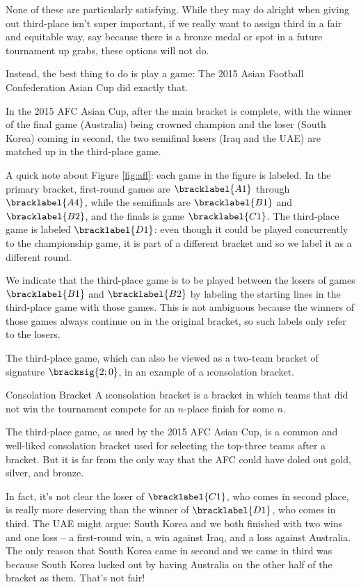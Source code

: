 {    None of these are particularly satisfying. While they may do alright when giving out third-place isn't super important, if we really want to assign third in a fair and equitable way, say because there is a bronze medal or spot in a future tournament up grabs, these options will not do.

    Instead, the best thing to do is play a game: The 2015 Asian Football Confederation Asian Cup did exactly that.


    In the 2015 AFC Asian Cup, after the main bracket is complete, with the winner of the final game (Australia) being crowned champion and the loser (South Korea) coming in second, the two semifinal losers (Iraq and the UAE) are matched up in the third-place game.

    A quick note about Figure \ref{fig:afl}: each game in the figure is labeled. In the primary bracket, first-round games are $\bracklabel{A1}$ through $\bracklabel{A4}$, while the semifinals are $\bracklabel{B1}$ and $\bracklabel{B2}$, and the finals is game $\bracklabel{C1}$. The third-place game is labeled $\bracklabel{D1}$: even though it could be played concurrently to the championship game, it is part of a different bracket and so we label it as a different round.

    We indicate that the third-place game is to be played between the losers of games $\bracklabel{B1}$ and $\bracklabel{B2}$ by labeling the starting lines in the third-place game with those games. This is not ambiguous because the winners of those games always continue on in the original bracket, so such labels only refer to the losers.

    The third-place game, which can also be viewed as a two-team bracket of signature $\bracksig{2;0}$, in an example of a \i{consolation bracket}.

    \begin{definition}{Consolation Bracket}{}
        A \i{consolation bracket} is a bracket in which teams that did not win the tournament compete for an $n$-place finish for some $n$.
    \end{definition}

    The third-place game, as used by the 2015 AFC Asian Cup, is a common and well-liked consolation bracket used for selecting the top-three teams after a bracket. But it is far from the only way that the AFC could have doled out gold, silver, and bronze.
    
    In fact, it's not clear the loser of $\bracklabel{C1}$, who comes in second place, is really more deserving than the winner of $\bracklabel{D1}$, who comes in third. The UAE might argue: South Korea and we both finished with two wins and one loss -- a first-round win, a win against Iraq, and a loss against Australia. The only reason that South Korea came in second and we came in third was because South Korea lucked out by having Australia on the other half of the bracket as them. That's not fair!

}
